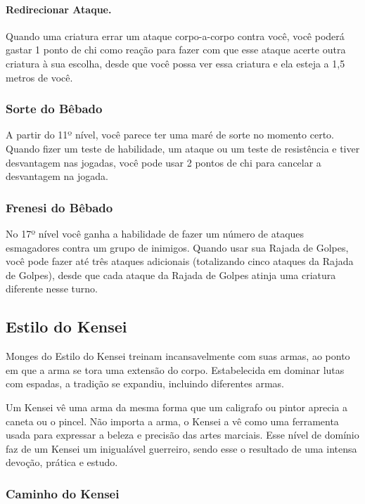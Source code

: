 \begin{multicols}{2}
\paragraph{Redirecionar Ataque.}%
Quando uma criatura errar um ataque corpo-a-corpo contra você, você poderá
gastar 1 ponto de chi como reação para fazer com que esse ataque acerte outra
criatura à sua escolha, desde que você possa ver essa criatura e ela esteja a
1,5 metros de você.

\subsubsection*{Sorte do Bêbado}%
\label{ssub:sorte_do_bebado}

A partir do 11º nível, você parece ter uma maré de sorte no momento certo.
Quando fizer um teste de habilidade, um ataque ou um teste de resistência e
tiver desvantagem nas jogadas, você pode usar 2 pontos de chi para cancelar a
desvantagem na jogada.

\subsubsection*{Frenesi do Bêbado}%
\label{ssub:frenesi_do_bebado}

No 17º nível você ganha a habilidade de fazer um número de ataques esmagadores
contra um grupo de inimigos. Quando usar sua Rajada de Golpes, você pode fazer
até três ataques adicionais (totalizando cinco ataques da Rajada de Golpes),
desde que cada ataque da Rajada de Golpes atinja uma criatura diferente nesse
turno.

\subsection*{Estilo do Kensei}%
\label{sub:estilo_do_kensei}

Monges do Estilo do Kensei treinam incansavelmente com suas armas, ao ponto em
que a arma se tora uma extensão do corpo. Estabelecida em dominar lutas com
espadas, a tradição se expandiu, incluindo diferentes armas.

Um Kensei vê uma arma da mesma forma que um caligrafo ou pintor aprecia a caneta
ou o pincel. Não importa a arma, o Kensei a vê como uma ferramenta usada para
expressar a beleza e precisão das artes marciais. Esse nível de domínio faz de
um Kensei um inigualável guerreiro, sendo esse o resultado de uma intensa
devoção, prática e estudo.

\subsubsection*{Caminho do Kensei}%
\label{ssub:caminho_do_kensei}


\end{multicols}
